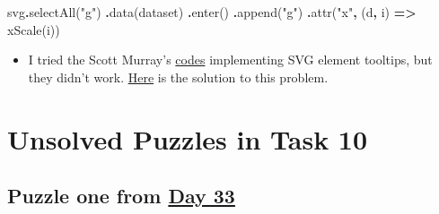 \documentclass[
]{book}
\newenvironment{Shaded}{\begin{snugshade}}{\end{snugshade}}
\newcommand{\FunctionTok}[1]{\textcolor[rgb]{0.00,0.00,0.00}{#1}}
\newcommand{\KeywordTok}[1]{\textcolor[rgb]{0.13,0.29,0.53}{\textbf{#1}}}
\newcommand{\NormalTok}[1]{#1}
\newcommand{\OperatorTok}[1]{\textcolor[rgb]{0.81,0.36,0.00}{\textbf{#1}}}
\newcommand{\StringTok}[1]{\textcolor[rgb]{0.31,0.60,0.02}{#1}}
\providecommand{\tightlist}{%
  \setlength{\itemsep}{0pt}\setlength{\parskip}{0pt}}
\begin{document}
\begin{Shaded}
\begin{Highlighting}[]
\NormalTok{svg}\OperatorTok{.}\FunctionTok{selectAll}\NormalTok{(}\StringTok{"g"}\NormalTok{)}
   \OperatorTok{.}\FunctionTok{data}\NormalTok{(dataset)}
   \OperatorTok{.}\FunctionTok{enter}\NormalTok{()}
   \OperatorTok{.}\FunctionTok{append}\NormalTok{(}\StringTok{"g"}\NormalTok{)}
   \OperatorTok{.}\FunctionTok{attr}\NormalTok{(}\StringTok{"x"}\OperatorTok{,}\NormalTok{ (d}\OperatorTok{,}\NormalTok{ i) }\KeywordTok{=\textgreater{}} \FunctionTok{xScale}\NormalTok{(i))}
\end{Highlighting}
\end{Shaded}

\begin{itemize}
\tightlist
\item
  I tried the Scott Murray's \href{https://github.com/scotthmurray/d3-book/blob/master/chapter_10/13_svg_tooltip.html}{codes} implementing SVG element tooltips, but they didn't work. \href{https://github.com/scotthmurray/d3-book/issues/47}{Here} is the solution to this problem.
\end{itemize}

\hypertarget{unsolved-puzzles-in-task-10}{%
\section{Unsolved Puzzles in Task 10}\label{unsolved-puzzles-in-task-10}}

\hypertarget{puzzle-one-from-day-33}{%
\subsection{\texorpdfstring{Puzzle one from \href{https://observablehq.com/@hongtaoh/day-33-2020-09-26}{Day 33}}{Puzzle one from Day 33}}\label{puzzle-one-from-day-33}}
\end{document}
